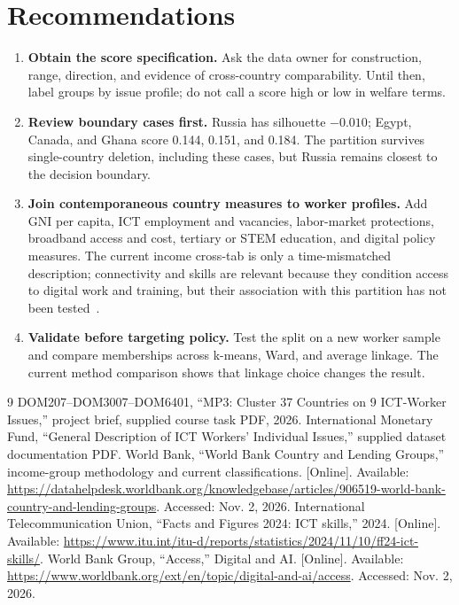 \documentclass[9pt,twocolumn]{extarticle}
\begin{document}
\section{Recommendations}
\begin{enumerate}
\item \textbf{Obtain the score specification.} Ask the data owner for construction, range, direction, and evidence of cross-country comparability. Until then, label groups by issue profile; do not call a score high or low in welfare terms.
\item \textbf{Review boundary cases first.} Russia has silhouette $-0.010$; Egypt, Canada, and Ghana score 0.144, 0.151, and 0.184. The partition survives single-country deletion, including these cases, but Russia remains closest to the decision boundary.
\item \textbf{Join contemporaneous country measures to worker profiles.} Add GNI per capita, ICT employment and vacancies, labor-market protections, broadband access and cost, tertiary or STEM education, and digital policy measures. The current income cross-tab is only a time-mismatched description; connectivity and skills are relevant because they condition access to digital work and training, but their association with this partition has not been tested~\cite{wbaccess}.
\item \textbf{Validate before targeting policy.} Test the split on a new worker sample and compare memberships across k-means, Ward, and average linkage. The current method comparison shows that linkage choice changes the result.
\end{enumerate}

\begin{thebibliography}{9}
 DOM207--DOM3007--DOM6401, ``MP3: Cluster 37 Countries on 9 ICT-Worker Issues,'' project brief, supplied course task PDF, 2026.
 International Monetary Fund, ``General Description of ICT Workers' Individual Issues,'' supplied dataset documentation PDF.
 World Bank, ``World Bank Country and Lending Groups,'' income-group methodology and current classifications. [Online]. Available: \url{https://datahelpdesk.worldbank.org/knowledgebase/articles/906519-world-bank-country-and-lending-groups}. Accessed: Nov. 2, 2026.
 International Telecommunication Union, ``Facts and Figures 2024: ICT skills,'' 2024. [Online]. Available: \url{https://www.itu.int/itu-d/reports/statistics/2024/11/10/ff24-ict-skills/}.
 World Bank Group, ``Access,'' Digital and AI. [Online]. Available: \url{https://www.worldbank.org/ext/en/topic/digital-and-ai/access}. Accessed: Nov. 2, 2026.
\end{thebibliography}
\end{document}
